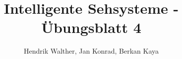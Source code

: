 \documentclass[deutsch]{llncs}
\begin{document}
\title{Intelligente Sehsysteme - Übungsblatt 4}


\author{Hendrik Walther, Jan Konrad, Berkan Kaya}
\institute{}
\maketitle

\newpage

\newpage

\newpage

\end{document}
